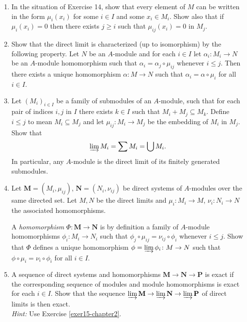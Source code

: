 \begin{enumerate}
    \item \label{exer15-chapter2}In the situation of Exercise 14, show that every element of $M$ can be written in the form $\mu_i(x_i)$ for some $i \in I$ and some $x_i \in M_i$. Show also that if $\mu_i(x_i) = 0$ then there exists $j \geq i$ such that $\mu_{ij}(x_i) = 0$ in $M_j$.

    \item \label{exer16-chapter2}Show that the direct limit is characterized (up to isomorphism) by the following property. Let $N$ be an $A$-module and for each $i \in I$ let $\alpha_i \colon M_i \to N$ be an $A$-module homomorphism such that $\alpha_i = \alpha_j \circ \mu_{ij}$ whenever $i \leq j$. Then there exists a unique homomorphism $\alpha \colon M \to N$ such that $\alpha_i = \alpha \circ \mu_i$ for all $i \in I$.

    \item \label{exer17-chapter2}Let $(M_i)_{i \in I}$ be a family of submodules of an $A$-module, such that for each pair of indices $i, j$ in $I$ there exists $k \in I$ such that $M_i + M_j \subseteq M_k$. Define $i \leq j$ to mean $M_i \subseteq M_j$ and let $\mu_{ij} \colon M_i \to M_j$ be the embedding of $M_i$ in $M_j$. Show that
    \[
    \varinjlim M_i = \sum M_i = \bigcup M_i.
    \]
    In particular, any $A$-module is the direct limit of its finitely generated submodules.

    \item \label{exer18-chapter2}Let $\mathbf{M} = (M_i, \mu_{ij})$, $\mathbf{N} = (N_i, \nu_{ij})$ be direct systems of $A$-modules over the same directed set. Let $M, N$ be the direct limits and $\mu_i \colon M_i \to M$, $\nu_i \colon N_i \to N$ the associated homomorphisms. 
    
    A \emph{homomorphism} $\Phi \colon \mathbf{M} \to \mathbf{N}$ is by definition a family of $A$-module homomorphisms $\phi_i \colon M_i \to N_i$ such that $\phi_j \circ \mu_{ij} = \nu_{ij} \circ \phi_i$ whenever $i \leq j$. Show that $\Phi$ defines a unique homomorphism $\phi = \varinjlim \phi_i \colon M \to N$ such that $\phi \circ \mu_i = \nu_i \circ \phi_i$ for all $i \in I$.

    \item \label{exer19-chapter2}A sequence of direct systems and homomorphisms $\mathbf{M} \to \mathbf{N} \to \mathbf{P}$ is exact if the corresponding sequence of modules and module homomorphisms is exact for each $i \in I$. Show that the sequence $\varinjlim \mathbf{M} \to \varinjlim \mathbf{N} \to \varinjlim \mathbf{P}$ of direct limits is then exact.\\
    \textit{Hint:} Use Exercise \ref{exer15-chapter2}.


\end{enumerate}
